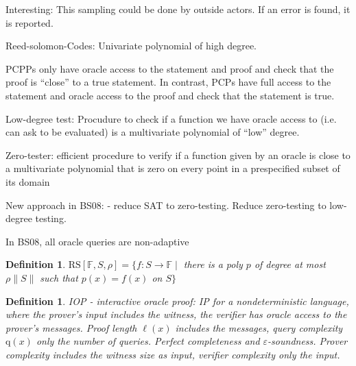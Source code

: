 \documentclass[11pt,letterpaper]{article}
\newtheorem{definition}[dummytheorem]{Definition}
\newcommand{\eps}{\varepsilon}
\begin{document}
Interesting: This sampling could be done by outside actors. If an error is found, it is reported.

Reed-solomon-Codes: Univariate polynomial of high degree.

PCPPs only have oracle access to the statement and proof and check that the proof is ``close'' to a true statement.
In contrast, PCPs have full access to the statement and oracle access to the proof and check that the statement is true.

Low-degree test: Procudure to check if a function we have oracle access to (i.e. can ask to be evaluated) is a multivariate polynomial of ``low'' degree.

Zero-tester: efficient procedure to verify if a function given by an oracle is close to a multivariate polynomial that is
zero on every point in a prespecified subset of its domain

New approach in BS08:
 - reduce SAT to zero-testing. Reduce zero-testing to low-degree testing.

In BS08, all oracle queries are non-adaptive

\begin{definition}
$\mathrm{RS}[\mathbb{F}, S, \rho] = \{ f \colon S \to \mathbb{F} \mid $
there is a poly $p$ of degree at most $\rho\|S\|$ such that $p(x)=f(x)$ on $S \}$
\end{definition}

\begin{definition}
IOP - interactive oracle proof: IP for a nondeterministic language, where the prover's input includes the witness, the verifier
has oracle access to the prover's messages. Proof length $\ell(x)$ includes the messages, query complexity $\mathrm{q}(x)$ only
the number of queries. Perfect completeness and $\eps$-soundness.
Prover complexity includes the witness size as input, verifier complexity only the input.
\end{definition}
\end{document}
